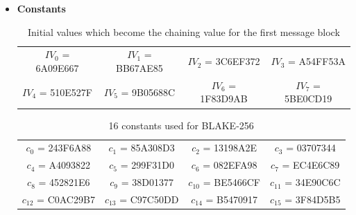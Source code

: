   \begin{itemize}
    \item {\bf Constants}
      \begin{table}[h]
        \begin{center}
          \begin{tabular}{ *{4}{c}}
            $IV_{0}$ = 6A09E667 & $IV_{1}$ = BB67AE85 & $IV_{2}$ = 3C6EF372 & $IV_{3}$ = A54FF53A \\
            $IV_{4}$ = 510E527F & $IV_{5}$ = 9B05688C & $IV_{6}$ = 1F83D9AB & $IV_{7}$ = 5BE0CD19 \\
          \end{tabular}
          \caption{Initial values which become the chaining value for the first message block}
        \end{center}
      \end{table}
      
      \begin{table}[h]
        \begin{center}
          \begin{tabular}{ *{4}{c}}
            $c_{0}$  = 243F6A88 & $c_{1}$  = 85A308D3 & $c_{2}$  = 13198A2E & $c_{3}$  = 03707344 \\
            $c_{4}$  = A4093822 & $c_{5}$  = 299F31D0 & $c_{6}$  = 082EFA98 & $c_{7}$  = EC4E6C89 \\
            $c_{8}$  = 452821E6 & $c_{9}$  = 38D01377 & $c_{10}$ = BE5466CF & $c_{11}$ = 34E90C6C \\
            $c_{12}$ = C0AC29B7 & $c_{13}$ = C97C50DD & $c_{14}$ = B5470917 & $c_{15}$ = 3F84D5B5 \\
          \end{tabular}
          \caption{16 constants used for BLAKE-256}
        \end{center}
      \end{table}


\end{itemize}
